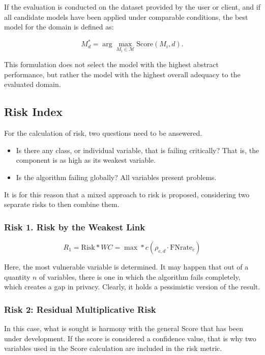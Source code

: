 \documentclass[11pt,a4paper]{article}
\begin{document}
If the evaluation is conducted on the dataset provided by the user or client, and if all candidate models have been applied under comparable conditions, the best model for the domain is defined as:

\begin{equation}
    M_d^*=
    \arg\max_{M_i\in\mathcal{M}}
    \mathrm{Score}(M_i,d).
\end{equation}

This formulation does not select the model with the highest abstract performance, but rather the model with the highest overall adequacy to the evaluated domain.

\subsection{Risk Index}

For the calculation of risk,  two questions need to be ansewered.

\begin{itemize}
\item Is there any class, or individual variable, that is failing critically? That is, the component is as high as its weakest variable.
\item Is the algorithm failing globally? All variables present problems.
\end{itemize}

It is for this reason that a mixed approach to risk is proposed, considering two separate risks to then combine them.

\subsubsection{Risk 1. Risk by the Weakest Link}

\begin{equation*}
R_1=\text{Risk}*{WC} = \max*{c} ( \rho_{c,d} \cdot \text{FNrate}_c )
\end{equation*}

Here, the most vulnerable variable is determined. It may happen that out of a quantity $n$ of variables, there is one in which the algorithm fails completely, which creates a gap in privacy. Clearly, it holds a pessimistic version of the result.

\subsubsection{Risk 2: Residual Multiplicative Risk}
In this case, what is sought is harmony with the general Score that has been under development. If the score is considered a confidence value, that is why two variables used in the Score calculation are included in the risk metric.
\end{document}
